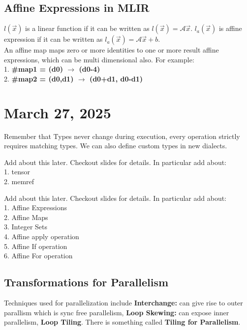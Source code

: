 \documentclass{article}
\begin{document}
\subsection*{Affine Expressions in MLIR}
$l(\vec{x})$ is a linear function if it can be written as $l(\vec{x}) = \mathcal{A}\vec{x}$. $l_a(\vec{x})$ is affine expression if it can be written as $l_a(\vec{x}) = \mathcal{A}\vec{x} + b$. \\

An affine map maps zero or more identities to one or more result affine expressions, which can be multi dimensional also. For example: \\ 
1. \textbf{\#map1 = (d0) $\rightarrow$ (d0-4)} \\
2. \textbf{\#map2 = (d0,d1) $\rightarrow$ (d0+d1, d0-d1)} \\ 

\section*{March 27, 2025}

Remember that Types never change during execution, every operation strictly requires matching types. We can also define custom types in new dialects.

\begin{tcolorbox}[colback=blue!5!white,colframe=blue!75!black,title=\textbf{Types Relevant for Dense Matrices / Tensors}]
    Add about this later. Checkout slides for details. In particular add about: \\
    1. tensor \\
    2. memref \\
\end{tcolorbox}

\begin{tcolorbox}[colback=blue!5!white,colframe=blue!75!black,title=\textbf{Polyhedral Structures in IR}]
    Add about this later. Checkout slides for details. In particular add about: \\
    1. Affine Expressions \\
    2. Affine Maps \\
    3. Integer Sets \\
    4. Affine apply operation \\
    5. Affine If operation \\
    6. Affine For operation \\
\end{tcolorbox}

\subsection*{Transformations for Parallelism}
Techniques used for parallelization include \textbf{Interchange: } can give rise to outer parallism which is sync free parallelism, \textbf{Loop Skewing: } can expose inner parallelism, \textbf{Loop Tiling}. There is something called \textbf{Tiling for Parallelism}. \\
\end{document}
